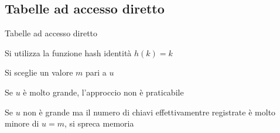 \subsection{Tabelle ad accesso diretto}


\begin{frame}{Tabelle ad accesso diretto}

\vspace{-9pt}

\begin{myboxtitle}
\BI
\item Si utilizza la \alert{funzione hash identità} $h(k)=k$
\item Si sceglie un valore $m$ pari a $u$
\EI
\end{myboxtitle}

\begin{myboxtitle}[Problemi]
\BI
\item Se $u$ è molto grande, l'approccio non è  praticabile 
\item Se $u$ non è grande ma il numero di chiavi 
effettivamentre registrate è molto minore di $u=m$, si spreca memoria
\EI
\end{myboxtitle}

\end{frame}

